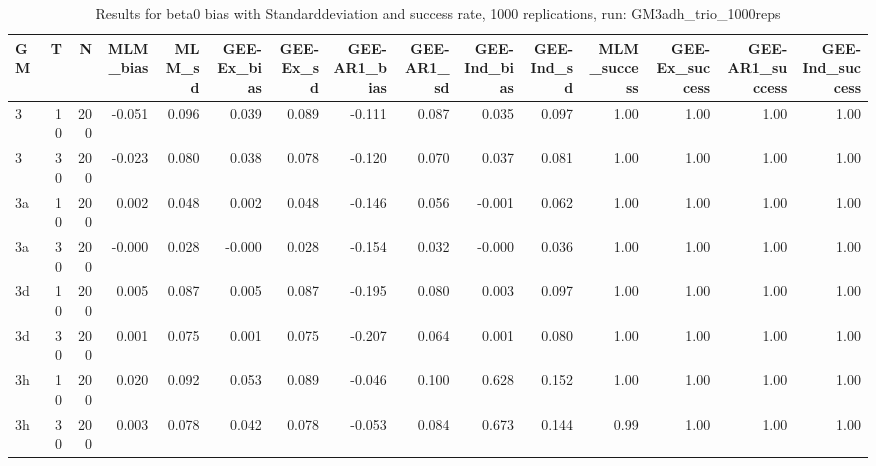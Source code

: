 \begin{table}[ht]
\centering
\begin{tabular}{lrrrrrrrrrrrrrr}
  \hline
GM & T & N & MLM\_bias & MLM\_sd & GEE-Ex\_bias & GEE-Ex\_sd & GEE-AR1\_bias & GEE-AR1\_sd & GEE-Ind\_bias & GEE-Ind\_sd & MLM\_success & GEE-Ex\_success & GEE-AR1\_success & GEE-Ind\_success \\ 
  \hline
3 & 10 & 200 & -0.051 & 0.096 & 0.039 & 0.089 & -0.111 & 0.087 & 0.035 & 0.097 & 1.00 & 1.00 & 1.00 & 1.00 \\ 
  3 & 30 & 200 & -0.023 & 0.080 & 0.038 & 0.078 & -0.120 & 0.070 & 0.037 & 0.081 & 1.00 & 1.00 & 1.00 & 1.00 \\ 
  3a & 10 & 200 & 0.002 & 0.048 & 0.002 & 0.048 & -0.146 & 0.056 & -0.001 & 0.062 & 1.00 & 1.00 & 1.00 & 1.00 \\ 
  3a & 30 & 200 & -0.000 & 0.028 & -0.000 & 0.028 & -0.154 & 0.032 & -0.000 & 0.036 & 1.00 & 1.00 & 1.00 & 1.00 \\ 
  3d & 10 & 200 & 0.005 & 0.087 & 0.005 & 0.087 & -0.195 & 0.080 & 0.003 & 0.097 & 1.00 & 1.00 & 1.00 & 1.00 \\ 
  3d & 30 & 200 & 0.001 & 0.075 & 0.001 & 0.075 & -0.207 & 0.064 & 0.001 & 0.080 & 1.00 & 1.00 & 1.00 & 1.00 \\ 
  3h & 10 & 200 & 0.020 & 0.092 & 0.053 & 0.089 & -0.046 & 0.100 & 0.628 & 0.152 & 1.00 & 1.00 & 1.00 & 1.00 \\ 
  3h & 30 & 200 & 0.003 & 0.078 & 0.042 & 0.078 & -0.053 & 0.084 & 0.673 & 0.144 & 0.99 & 1.00 & 1.00 & 1.00 \\ 
   \hline
\end{tabular}
\caption{Results for beta0 bias with Standarddeviation and success rate, 1000 replications, run: GM3adh_trio_1000reps} 
\label{tab:beta0_bias_sd_success}
\end{table}
